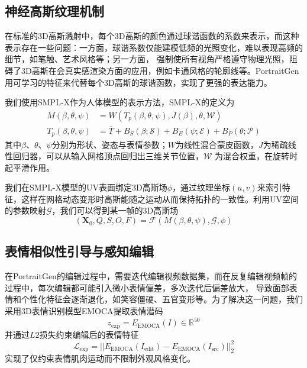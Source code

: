 \subsection{神经高斯纹理机制}

在标准的3D高斯溅射中，每个3D高斯的颜色通过球谐函数的系数来表示，而这种表示存在一些问题：一方面，球谐系数仅能建模低频的光照变化，难以表现高频的细节，如笔触、艺术风格等；另一方面，
强制使所有视角严格遵守物理光照，阻碍了3D高斯在会真实感渲染方面的应用，例如卡通风格的轮廓线等。PortraitGen用可学习的特征来代替每个3D高斯的球谐函数，实现了更强的表达能力。

我们使用SMPL-X\cite{pavlakos2019expressive}作为人体模型的表示方法，SMPL-X的定义为
\begin{align}
    M(\beta,\theta,\psi)&=W(T_p(\beta,\theta,\psi), J(\beta),\theta, \mathcal{W})\\
    T_p(\beta,\theta,\psi)&=\bar{T}+B_S(\beta;\mathcal{S})+B_E(\psi;\mathcal{E})+B_P(\theta;\mathcal{P})
\end{align}
其中$\beta$、$\theta$、$\psi$分别为形状、姿态与表情参数；$W$为线性混合蒙皮函数，$J$为稀疏线性回归器，可以从输入网格顶点回归出三维关节位置，$\mathcal{W}$
为混合权重，在旋转时起平滑作用。

我们在SMPL-X模型的UV表面绑定3D高斯场$\phi$，通过纹理坐标$(u,v)$来索引特征，这样在网格动态变形时高斯能随之运动从而保持拓扑的一致性。利用UV空间的参数映射$\mathcal{G}$，我们可以得到某一帧的3D高斯场
\begin{equation}
    (\symbf{X}_0,Q,S,O,F)=\mathcal{F}(M(\beta,\theta,\psi),\mathcal{G},\phi)
\end{equation}

\subsection{表情相似性引导与感知编辑}

在PortraitGen的编辑过程中，需要迭代编辑视频数据集，而在反复编辑视频帧的过程中，每次编辑都可能引入微小表情偏差，多次迭代后偏差放大，
导致面部表情和个性化特征会逐渐退化，如笑容僵硬、五官变形等。为了解决这一问题，我们采用3D表情识别模型EMOCA\cite{danvevcek2022emoca}提取表情潜码
\begin{equation}
    z_{\text{exp}}=E_{\text{EMOCA}}(I) \in \mathbb{R} ^{50}
\end{equation}
并通过$L2$损失约束编辑后的表情特征
\begin{equation}
    \mathcal{L}_{\text{exp}}=||E_{\text{EMOCA}}(I_{\text{edit}})-E_{\text{EMOCA}}(I_{\text{src}})||_2^2
\end{equation}
实现了仅约束表情肌肉运动而不限制外观风格变化。

